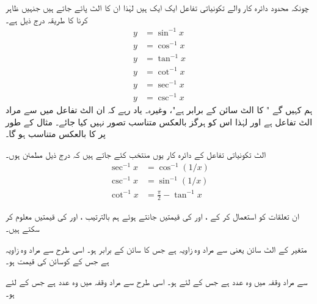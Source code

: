 چونکہ محدود دائرہ کار والے تکونیاتی تفاعل ایک ایک ہیں لہٰذا ان کا الٹ پائے جاتے ہیں جنہیں ظاہر کرنا کا طریقہ درج ذیل ہے۔
\begin{align*}
y&=\sin^{-1}x\\
y&=\cos^{-1}x\\
y&=\tan^{-1}x\\
y&=\cot^{-1}x\\
y&=\sec^{-1}x\\
y&=\csc^{-1}x
\end{align*}
ہم کہیں گے " کا الٹ سائن  کے برابر ہے"، وغیرہ۔ یاد رہے کہ ان الٹ تفاعل میں  سے مراد الٹ تفاعل ہے اور لہٰذا اس کو ہرگز بالعکس متناسب تصور نہیں کیا جائے۔ مثال کے طور پر  کا بالعکس متناسب  ہو گا۔

الٹ تکونیاتی تفاعل کے دائرہ کار یوں منتخب کئے جاتے ہیں کہ درج ذیل مطمئن ہوں۔
\begin{align}
\sec^{-1}x&=\cos^{-1}(1/x)\\
\csc^{-1}x&=\sin^{-1}(1/x)\\
\cot^{-1}x&=\tfrac{\pi}{2}-\tan^{-1}x
\end{align}

ان تعلقات کو استعمال کر کے ،  اور  کی قیمتیں جانتے ہوئے ہم بالترتیب ،  اور  کی قیمتیں معلوم کر سکتے ہیں۔

 متغیر  کے الٹ سائن یعنی  سے مراد وہ زاویہ ہے جس کا سائن  کے برابر ہو۔ اسی طرح  سے مراد وہ زاویہ ہے جس کے کوسائن کی قیمت  ہو۔

 سے مراد وقفہ  میں وہ عدد  ہے جس کے لئے  ہو۔ اسی طرح 
 سے مراد وقفہ  میں وہ عدد  ہے جس کے لئے  ہو۔

